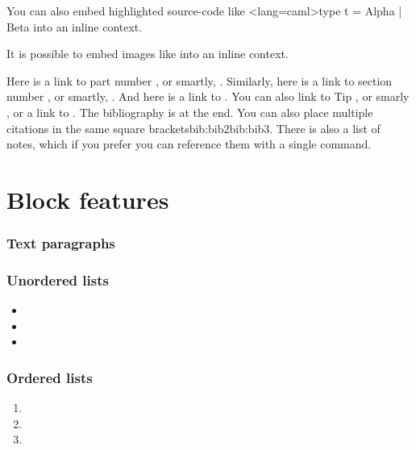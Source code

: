 \short
You can also embed highlighted source-code like \code<lang=caml>{type t = Alpha | Beta}
into an inline context.
\short

\short
It is possible to embed images like  into an inline context.
\short

Here is a link to part number , or smartly, .
Similarly, here is a link to section number , or smartly,
.  And here is a link to .  You can also link to Tip , or smarly ,
or a link to . The bibliography is at the
end\cite{bib:bib1}\cite{bib:bib2}\cite{bib:bib3}.  You can also place multiple
citations in the same square brackets\cite{bib:bib1}{bib:bib2}{bib:bib3}. There is
also a list of notes, which if you prefer
you can reference them with a single command.

\part{Block features}

\section[sec:foobar]{Text paragraphs}

\p{\lorem}
\p{\lorem}
\p{\lorem}
\p{\lorem}


\section{Unordered lists}

\p{\lorem}
\begin{itemize}
\item \lorem
\item \lorem
\item \lorem
\end{itemize}
\p{\lorem}

\section{Ordered lists}

\p{\lorem}
\begin{enumerate}
\item \p{\lorem}
\item \p{\lorem}
\item \p{\lorem}
\end{enumerate}
\p{\lorem}

